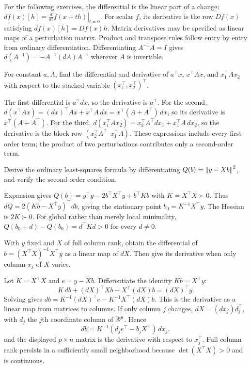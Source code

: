 For the following exercises, the differential is the linear part of a
change: $df(x)[h]=\left.\frac{d}{dt}f(x+th)\right|_{t=0}$.
For scalar $f$, its derivative is the row $Df(x)$ satisfying
$df(x)[h]=Df(x)h$. Matrix derivatives may be specified as linear maps
of a perturbation matrix. Product and transpose rules follow entry by
entry from ordinary differentiation. Differentiating $A^{-1}A=I$ gives
$d(A^{-1})=-A^{-1}(dA)A^{-1}$ wherever $A$ is invertible.

\begin{problem}
For constant $a,A$, find the differential and derivative of $a^\top x$,
$x^\top Ax$, and $x_1^\top Ax_2$ with respect to the stacked variable
$(x_1^\top,x_2^\top)^\top$.
\end{problem}
\begin{solution}
The first differential is $a^\top dx$, so the derivative is $a^\top$.
For the second,
$d(x^\top Ax)=(dx)^\top Ax+x^\top A\,dx=x^\top(A+A^\top)\,dx$,
so its derivative is $x^\top(A+A^\top)$.
For the third,
$d(x_1^\top Ax_2)=x_2^\top A^\top dx_1+x_1^\top A\,dx_2$,
so the derivative is the block row $(x_2^\top A^\top\ \ x_1^\top A)$.
These expressions include every first-order term; the product of two
perturbations contributes only a second-order term.
\end{solution}

\begin{problem}
Derive the ordinary least-squares formula by differentiating
$Q(b)=\left\lVert y-Xb\right\rVert^2$, and verify the second-order condition.
\end{problem}
\begin{solution}
Expansion gives $Q(b)=y^\top y-2b^\top X^\top y+b^\top Kb$ with
$K=X^\top X\succ0$.
Thus $dQ=2(Kb-X^\top y)^\top db$, giving the stationary point
$b_0=K^{-1}X^\top y$. The Hessian is $2K\succ0$.
For global rather than merely local minimality,
$Q(b_0+d)-Q(b_0)=d^\top Kd>0$ for every $d\ne0$.
\end{solution}

\begin{problem}
With $y$ fixed and $X$ of full column rank, obtain the differential of
$b=(X^\top X)^{-1}X^\top y$ as a linear map of $dX$.
Then give its derivative when only column $x_j$ of $X$ varies.
\end{problem}
\begin{solution}
Let $K=X^\top X$ and $e=y-Xb$.
Differentiate the identity $Kb=X^\top y$:
\[
K\,db+(dX)^\top Xb+X^\top(dX)b=(dX)^\top y.
\]
Solving gives
$db=K^{-1}(dX)^\top e-K^{-1}X^\top(dX)b$.
This is the derivative as a linear map from matrices to columns.
If only column $j$ changes, $dX=(dx_j)d_j^\top$, with $d_j$ the
$j$th coordinate column of $\mathbb R^p$. Hence
\[
db=K^{-1}(d_je^\top-b_jX^\top)\,dx_j,
\]
and the displayed $p\times n$ matrix is the derivative with respect
to $x_j^\top$. Full column rank persists in a sufficiently small
neighborhood because $\det(X^\top X)>0$ and is continuous.
\end{solution}


